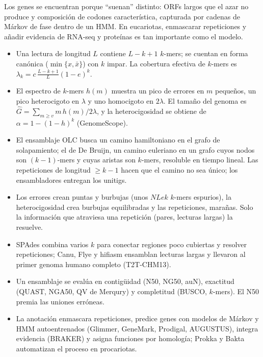 \begin{ideaclave}
Los genes se encuentran porque ``suenan'' distinto: ORFs largos que el azar no produce y composición de codones característica, capturada por cadenas de Márkov de fase dentro de un HMM. En eucariotas, enmascarar repeticiones y añadir evidencia de RNA-seq y proteínas es tan importante como el modelo.
\end{ideaclave}

\begin{resumen}
\begin{itemize}
  \item Una lectura de longitud $L$ contiene $L-k+1$ $k$-mers; se cuentan en forma canónica ($\min\{x,\bar{x}\}$) con $k$ impar. La cobertura efectiva de $k$-mers es $\lambda_k=c\,\frac{L-k+1}{L}(1-e)^k$.
  \item El espectro de $k$-mers $h(m)$ muestra un pico de errores en $m$ pequeños, un pico heterocigoto en $\lambda$ y uno homocigoto en $2\lambda$. El tamaño del genoma es $\widehat G=\sum_{m\ge v}m\,h(m)/2\lambda$, y la heterocigosidad se obtiene de $\alpha=1-(1-h)^k$ (GenomeScope).
  \item El ensamblaje OLC busca un camino hamiltoniano en el grafo de solapamiento; el de De Bruijn, un camino euleriano en un grafo cuyos nodos son $(k-1)$-mers y cuyas aristas son $k$-mers, resoluble en tiempo lineal. Las repeticiones de longitud $\ge k-1$ hacen que el camino no sea único; los ensambladores entregan los unitigs.
  \item Los errores crean puntas y burbujas (unos $NLek$ $k$-mers espurios), la heterocigosidad crea burbujas equilibradas y las repeticiones, marañas. Solo la información que atraviesa una repetición (pares, lecturas largas) la resuelve.
  \item SPAdes combina varios $k$ para conectar regiones poco cubiertas y resolver repeticiones; Canu, Flye y hifiasm ensamblan lecturas largas y llevaron al primer genoma humano completo (T2T-CHM13).
  \item Un ensamblaje se evalúa en contigüidad (N50, NG50, auN), exactitud (QUAST, NGA50, QV de Merqury) y completitud (BUSCO, $k$-mers). El N50 premia las uniones erróneas.
  \item La anotación enmascara repeticiones, predice genes con modelos de Márkov y HMM autoentrenados (Glimmer, GeneMark, Prodigal, AUGUSTUS), integra evidencia (BRAKER) y asigna funciones por homología; Prokka y Bakta automatizan el proceso en procariotas.
\end{itemize}
\end{resumen}

